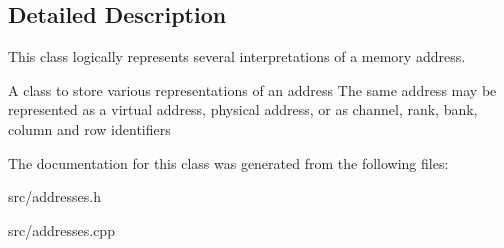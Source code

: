\subsection{Detailed Description}
This class logically represents several interpretations of a memory address. 

A class to store various representations of an address The same address may be represented as a virtual address, physical address, or as channel, rank, bank, column and row identifiers 

The documentation for this class was generated from the following files:\begin{CompactItemize}
\item 
src/addresses.h\item 
src/addresses.cpp\end{CompactItemize}
